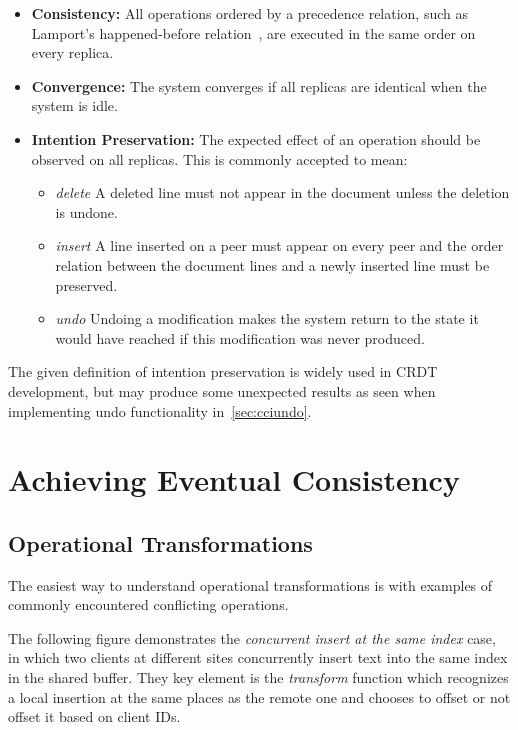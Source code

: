 \documentclass[12pt,a4paper,twoside,openright]{report}
\begin{document}
	\begin{itemize}
		\item \textbf{Consistency:} All operations ordered by a precedence relation, such as Lamport’s happened-before relation~\cite{lamport1978}, are executed in the same order on every replica.
	
		\item \textbf{Convergence:} The system converges if all replicas are identical when the system is idle.
		
		\item \textbf{Intention Preservation:} The expected effect of an operation should be observed on all replicas. This is commonly accepted to mean:

			\begin{itemize}
				\item \textit{delete}  A deleted line must not appear in the document unless the deletion is undone.
				
				\item \textit{insert}  A line inserted on a peer must appear on every peer and the order relation between the document lines and a newly inserted line must be preserved.
				
				\item  \textit{undo}  Undoing a modification makes the system return to the state it would have reached if this modification was never produced.
				
			\end{itemize}	
		
	\end{itemize}
	
	The given definition of intention preservation is widely used in CRDT development, but may produce some unexpected results as seen when implementing undo functionality in~\cref{sec:cciundo}.
	

\section{Achieving Eventual Consistency}

	\subsection{Operational Transformations}
	
	The easiest way to understand operational transformations is with examples of commonly encountered conflicting operations.
	
	The following figure demonstrates the \textit{concurrent insert at the same index} case, in which two clients at different sites concurrently insert text into the same index in the shared buffer. They key element is the \textit{transform} function which recognizes a local insertion at the same places as the remote one and chooses to offset or not offset it based on client IDs.
	
\end{document}
